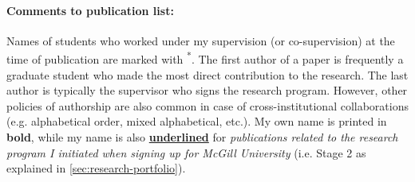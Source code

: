 \paragraph{Comments to publication list:} 
Names of students who worked under my supervision (or co-supervision) at the time of publication are marked with \textsuperscript{*}. The first author of a paper is frequently a graduate student who made the most direct contribution to the research. The last author is typically the supervisor who signs the research program. However, other policies of authorship are also common in case of cross-institutional collaborations (e.g. alphabetical order, mixed alphabetical, etc.). My own name is printed in \textbf{bold}, while my name is also \textbf{\underline{underlined}} for \emph{publications related to the research program I initiated when signing up for McGill University} (i.e. Stage 2 as explained in \autoref{sec:research-portfolio}). %


